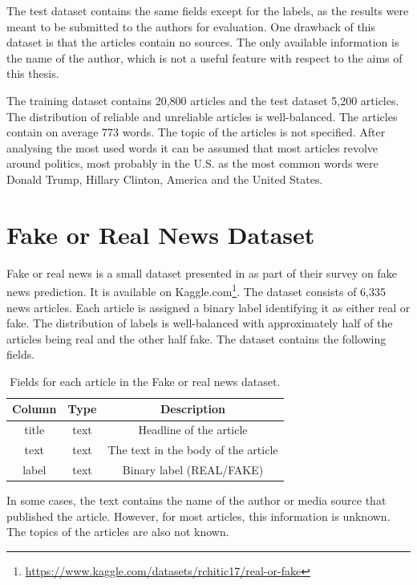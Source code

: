The test dataset contains the same fields except for the labels, as the results were meant to be submitted to the authors for evaluation. One drawback of this dataset is that the articles contain no sources. The only available information is the name of the author, which is not a useful feature with respect to the aims of this thesis.

The training dataset contains 20,800 articles and the test dataset 5,200 articles. The distribution of reliable and unreliable articles is well-balanced. The articles contain on average 773 words. The topic of the articles is not specified. After analysing the most used words it can be assumed that most articles revolve around politics, most probably in the U.S. as the most common words were Donald Trump, Hillary Clinton, America and the United States.


\section{Fake or Real News Dataset}
\label{fake_or_real_news}
Fake or real news is a small dataset presented in \cite{fake_or_real_dataset} as part of their survey on fake news prediction. It is available on Kaggle.com\footnote{\url{https://www.kaggle.com/datasets/rchitic17/real-or-fake}}. The dataset consists of 6,335 news articles. Each article is assigned a binary label identifying it as either real or fake. The distribution of labels is well-balanced with approximately half of the articles being real and the other half fake. The dataset contains the following fields.


\begin{table}[H]
\centering
    \begin{tabular}{c|c|c}
    \textbf{Column} & \cellcolor[HTML]{FFFFFF}\textbf{Type} & \cellcolor[HTML]{FFFFFF}\textbf{Description} \\ \hline
    title & text & Headline of the article             \\
    text  & text & The text in the body of the article \\
    label & text & Binary label (REAL/FAKE)           
    \end{tabular}
    \label{tab:fake_or_real_fields}
    \caption{Fields for each article in the Fake or real news dataset.}
\end{table}


In some cases, the text contains the name of the author or media source that published the article. However, for most articles, this information is unknown. The topics of the articles are also not known.


